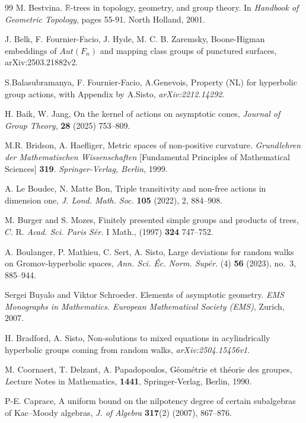 \documentclass[11pt,letterpaper]{article}
\theoremstyle{definition}
\theoremstyle{remark}
\begin{document}
\begin{thebibliography}{99}
M. Bestvina. $\mathbb{R}$-trees in topology, geometry, and group theory. In \emph{Handbook of Geometric Topology}, pages 55-91. North Holland, 2001.

J. Belk, F. Fournier-Facio, J. Hyde, M. C. B. Zaremsky, Boone-Higman embeddings of $Aut(F_n)$ and mapping class groups of punctured surfaces,  arXiv:2503.21882v2.

S.Balasubramanya, F. Fournier-Facio, A.Genevois, Property (NL) for hyperbolic group actions, with Appendix by A.Sisto, {\it arXiv:2212.14292}.

H. Baik, W. Jang, On the kernel of actions on asymptotic cones, \emph{Journal of Group Theory}, \textbf{28} (2025) 753--809.

 M.R. Bridson, A. Haefliger,
Metric spaces of non-positive curvature.
\emph{Grundlehren der Mathematischen Wissenschaften} [Fundamental Principles of Mathematical Sciences] \textbf{319}. \emph{Springer-Verlag, Berlin}, 1999.

A. Le Boudec, N. Matte Bon, Triple transitivity and non-free actions in dimension one, \emph{J. Lond. Math. Soc.} \textbf{105} (2022), 2, 884--908.

M. Burger and S. Mozes, Finitely presented simple groups and products of trees, $C$. R. \emph{Acad. Sci. Paris Sér.} I Math., (1997) \textbf{324} 747--752.

A. Boulanger, P. Mathieu, C. Sert, A. Sisto, Large deviations for random walks on Gromov-hyperbolic spaces, \emph{Ann. Sci. \'Ec. Norm. Sup\'er.} (4) {\bf 56} (2023), no.~3, 885--944.

Sergei Buyalo and Viktor Schroeder. Elements of asymptotic geometry. \emph{EMS Monographs in Mathematics. European Mathematical Society (EMS)}, Zurich, 2007.

H. Bradford, A. Sisto, Non-solutions to mixed equations in acylindrically hyperbolic groups coming from random walks, \emph{arXiv:2504.15456v1}.


M. Coornaert, T. Delzant, A. Papadopoulos, Géométrie et théorie des groupes, {\emph Lecture Notes in Mathematics}, {\bf 1441}, Springer-Verlag, Berlin, 1990.

P-E. Caprace, A uniform bound on the nilpotency degree of certain subalgebras of Kac–Moody algebras, \emph{J. of Algebra} \textbf{317}(2) (2007), 867--876.


\end{thebibliography}
\end{document}
